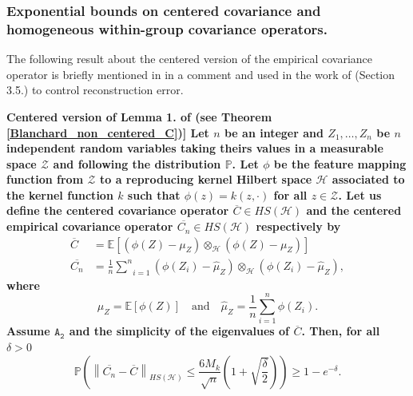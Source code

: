 \documentclass[twoside,11pt]{article}
\newcommand{\Hk}{\mathcal{H}}
\newcommand{\HSk}{HS(\mathcal{H})}
\newcommand{\PP}{\mathbb{P}}%
\newcommand{\PPO}{\mathbb{P} }
\newcommand{\EE}{\mathbb{E}}%
\newcommand{\A}[1]{$\mathtt{A_#1}$}
\begin{document}
\subsubsection*{Exponential bounds on centered covariance and homogeneous within-group covariance operators.}
The following result about the centered version of the empirical covariance operator is briefly mentioned in \citep{zwald2005convergence} in a comment and used in the work of \citep{blanchard2007statistical} (Section 3.5.) to control reconstruction error. 
\begin{lemma}
	\bf{Centered version of \bf{Lemma 1. of \cite{zwald2005convergence}}\rm} 
	\normalfont
	(see Theorem \ref{Blanchard_non_centered_C})]
Let $n$ be an integer and $Z_1,\ldots,Z_n$ be $n$ independent random variables taking theirs values in a measurable space $\mathcal{Z}$ and following the distribution $\PP$. Let $\phi$ be the feature mapping function from $\mathcal{Z}$ to a reproducing kernel Hilbert space $\Hk$ associated to the kernel function $k$ such that $\phi(z) = k(z,\cdot)$ for all $z \in \mathcal{Z}$. 
Let us define the centered covariance operator $\overline{C} \in \HSk$ and the centered empirical covariance operator $\overline{C_n} \in \HSk$ respectively by 
\begin{align*}
    \overline{C} &= \EE[\left(\phi(Z)-\mu_Z\right)\otimes_{\Hk} \left(\phi(Z)-\mu_Z\right)] \\
    \overline{C_n} &= \frac{1}{n} \underset{i=1}{\overset{n}{\sum}} \left(\phi(Z_i)-\widehat{\mu}_Z\right)\otimes_{\Hk} \left(\phi(Z_i)-\widehat{\mu}_Z\right),
\end{align*}
where   
\begin{equation*}
    \mu_Z = \EE[\phi(Z)] \quad \text{and} \quad \widehat{\mu}_Z = \frac{1}{n} \underset{i=1}{\overset{n}{\sum}} \phi(Z_i). 
\end{equation*}
Assume \A{2} and the simplicity of the eigenvalues of $\overline{C}$. Then, for all $\delta>0$ 
\begin{equation*}
     \PPO \left( \left \| \overline{C_n} - \overline{C} \right \|_{\HSk} \leq \frac{6 M_k}{\sqrt{n}} \left(1+ \sqrt{\frac{\delta}{2}}\right) \right) \geq 1 - e^{-\delta}.
\end{equation*}
\label{Blanchard_centered_C}
\end{lemma}
\end{document}
